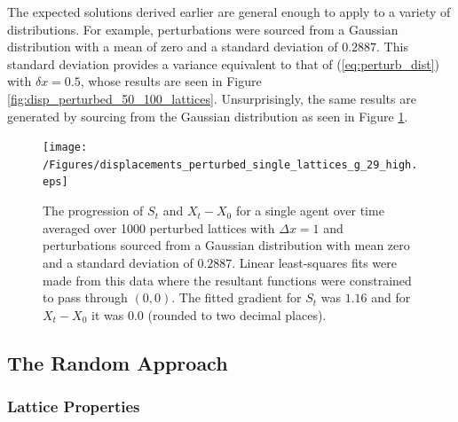 \documentclass[11pt,a4paper]{article}
\begin{document}
			The expected solutions derived earlier are general enough to apply to a variety of distributions. For example, perturbations were sourced from a Gaussian distribution with a mean of zero and a standard deviation of $0.2887$. This standard deviation provides a variance equivalent to that of (\ref{eq:perturb_dist}) with $\delta x = 0.5$, whose results are seen in Figure \ref{fig:disp_perturbed_50_100_lattices}. Unsurprisingly, the same results are generated by sourcing from the Gaussian distribution as seen in Figure \ref{fig:displacements_perturbed_single_lattices_g_29_high}.

			\begin{figure}[tbh]
				\centering
					\texttt{[image: /Figures/displacements\_perturbed\_single\_lattices\_g\_29\_high.eps]}
				\caption{The progression of $S_t$ and $X_t - X_0$ for a single agent over time averaged over 1000 perturbed lattices with $\Delta x = 1$ and perturbations sourced from a Gaussian distribution with mean zero and a standard deviation of $0.2887$. Linear least-squares fits were made from this data where the resultant functions were constrained to pass through $(0,0)$. The fitted gradient for $S_t$ was $1.16$ and for $X_t - X_0$ it was $0.0$ (rounded to two decimal places).}
				\label{fig:displacements_perturbed_single_lattices_g_29_high}
			\end{figure}

	

	\subsection{The Random Approach}
		\label{sub:therandomapproach}
		
		\subsubsection{Lattice Properties}
			\label{subs:latticeproperties_random}
			
\end{document}
